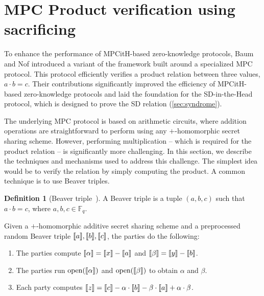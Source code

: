 \documentclass[11pt]{report}
\theoremstyle{definition}
\newtheorem{definition}{Definition}[section]
\theoremstyle{plain}
\begin{document}
\section{MPC Product verification using sacrificing}\label{sec:mpc_sacrificing}

To enhance the performance of MPCitH-based zero-knowledge protocols, Baum and Nof introduced a variant of the framework built around a specialized MPC protocol. This protocol efficiently verifies a product relation between three values, $  a \cdot b = c  $. Their contributions significantly improved the efficiency of MPCitH-based zero-knowledge protocols and laid the foundation for the SD-in-the-Head protocol, which is designed to prove the SD relation (\autoref{sec:syndrome}).

The underlying MPC protocol is based on arithmetic circuits, where addition operations are straightforward to perform using any $ + $-homomorphic secret sharing scheme. However, performing multiplication -- which is required for the product relation -- is significantly more challenging. In this section, we describe the techniques and mechanisms used to address this challenge. The simplest idea would be to verify the relation by simply computing the product. A common technique is to use Beaver triples.

\begin{definition}[Beaver triple~\cite{Beaver1992efficient}]\label{def:Beaver}
  A Beaver triple is a tuple $ (a, b, c) $ such that $ a \cdot b = c $, where $ a, b, c \in \mathbb{F}_q $.
\end{definition}

\begin{protocol}\label{def:Beaver-multiplication}
  Given a $+$-homomorphic additive secret sharing scheme and a preprocessed random Beaver triple $\llbracket a \rrbracket, \llbracket b \rrbracket, \llbracket c \rrbracket $, the parties do the following:
  \begin{enumerate}
    \item The parties compute $ \llbracket \alpha \rrbracket = \llbracket x \rrbracket - \llbracket a \rrbracket $ and $ \llbracket \beta \rrbracket = \llbracket y \rrbracket - \llbracket b \rrbracket $.
    \item The parties run $ \text{open}(\llbracket \alpha \rrbracket) $ and $ \text{open}(\llbracket \beta \rrbracket) $ to obtain $ \alpha $ and $ \beta $.
    \item Each party computes $ \llbracket z \rrbracket = \llbracket c \rrbracket - \alpha \cdot \llbracket b \rrbracket - \beta \cdot \llbracket a \rrbracket + \alpha \cdot \beta $.
  \end{enumerate}
\end{protocol}
\end{document}
